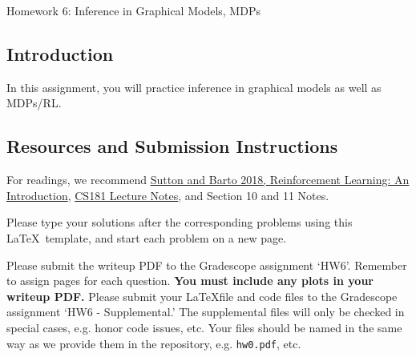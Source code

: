 \documentclass[submit]{../harvardml}
\begin{document}
\begin{center}
{\Large Homework 6: Inference in Graphical Models, MDPs}\\
\end{center}

\subsection*{Introduction}

In this assignment, you will practice inference in graphical models as
well as MDPs/RL.

\subsection*{Resources and Submission Instructions}

For readings, we recommend \href{http://incompleteideas.net/book/the-book-2nd.html}{Sutton and Barto 2018, Reinforcement Learning: An Introduction}, \href{https://harvard-ml-courses.github.io/cs181-web/}{CS181  Lecture Notes}, and Section 10 and 11 Notes.

Please type your solutions after the corresponding problems using this \LaTeX\ template, and start each problem on a new page.

Please submit the writeup PDF to the Gradescope assignment `HW6'. Remember to assign pages for each question.  \textbf{You must include any plots in your writeup PDF.} Please submit your \LaTeX file and code files to the Gradescope assignment `HW6 - Supplemental.' The supplemental files will only be checked in special cases, e.g. honor code issues, etc. Your files should be named in the same way as we provide them in the repository, e.g. \texttt{hw0.pdf}, etc.
\\

\newpage
\end{document}
